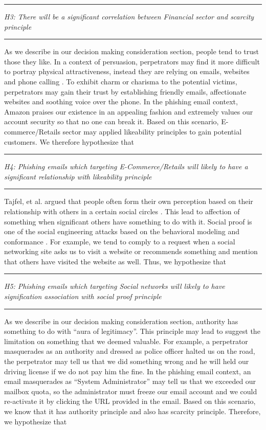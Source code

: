 \rule[0.5ex]{1\columnwidth}{1pt}

\textit{H3: There will be a significant correlation between Financial
sector and scarcity principle}

\rule[0.5ex]{1\columnwidth}{1pt}

As we describe in our decision making consideration section, people
tend to trust those they like. In a context of persuasion, perpetrators
may find it more difficult to portray physical attractiveness, instead
they are relying on emails, websites and phone calling \cite{dotterweich2006practicality}.
To exhibit charm or charisma to the potential victims, perpetrators
may gain their trust by establishing friendly emails, affectionate
websites and soothing voice over the phone. In the phishing email
context, Amazon praises our existence in an appealing fashion and
extremely values our account security so that no one can break it.
Based on this scenario, E-commerce/Retails sector may applied likeability
principles to gain potential customers. We therefore hypothesize that

\rule[0.5ex]{1\columnwidth}{1pt}

\textit{H4: Phishing emails which targeting E-Commerce/Retails will
likely to have a significant relationship with likeability principle}

\rule[0.5ex]{1\columnwidth}{1pt}

Tajfel, et al. argued that people often form their own perception
based on their relationship with others in a certain social circles
\cite{tajfel2004social}. This lead to affection of something when
significant others have something to do with it. Social proof is one
of the social engineering attacks based on the behavioral modeling
and conformance \cite{workman:2008}. For example, we tend to comply
to a request when a social networking site asks us to visit a website
or recommends something and mention that others have visited the website
as well. Thus, we hypothesize that 

\rule[0.5ex]{1\columnwidth}{1pt}

\textit{H5: Phishing emails which targeting Social networks will likely
to have signification association with social proof principle }

\rule[0.5ex]{1\columnwidth}{1pt}

As we describe in our decision making consideration section, authority
has something to do with ``aura of legitimacy''. This principle
may lead to suggest the limitation on something that we deemed valuable.
For example, a perpetrator masquerades as an authority and dressed
as police officer halted us on the road, the perpetrator may tell
us that we did something wrong and he will held our driving license
if we do not pay him the fine. In the phishing email context, an email
masquerades as ``System Administrator'' may tell us that we exceeded
our mailbox quota, so the administrator must freeze our email account
and we could re-activate it by clicking the URL provided in the email.
Based on this scenario, we know that it has authority principle and
also has scarcity principle. Therefore, we hypothesize that

